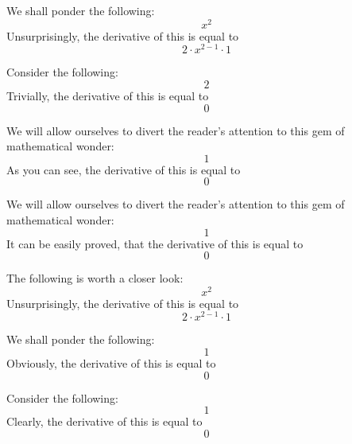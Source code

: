 \documentclass{article}
\begin{document}
We shall ponder the following:
\begin{equation}
x ^{2 } 
\end{equation}
Unsurprisingly, the derivative of this is equal to
\begin{equation}
2 \cdot x ^{2 - 1 } \cdot 1 
\end{equation}

Consider the following:
\begin{equation}
2 
\end{equation}
Trivially, the derivative of this is equal to
\begin{equation}
0 
\end{equation}

We will allow ourselves to divert the reader's attention to this gem of mathematical wonder:
\begin{equation}
1 
\end{equation}
As you can see, the derivative of this is equal to
\begin{equation}
0 
\end{equation}

We will allow ourselves to divert the reader's attention to this gem of mathematical wonder:
\begin{equation}
1 
\end{equation}
It can be easily proved, that the derivative of this is equal to
\begin{equation}
0 
\end{equation}

The following is worth a closer look:
\begin{equation}
x ^{2 } 
\end{equation}
Unsurprisingly, the derivative of this is equal to
\begin{equation}
2 \cdot x ^{2 - 1 } \cdot 1 
\end{equation}

We shall ponder the following:
\begin{equation}
1 
\end{equation}
Obviously, the derivative of this is equal to
\begin{equation}
0 
\end{equation}

Consider the following:
\begin{equation}
1 
\end{equation}
Clearly, the derivative of this is equal to
\begin{equation}
0 
\end{equation}
\end{document}
